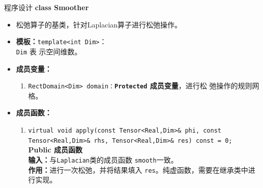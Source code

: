 \documentclass{beamer}
\begin{document}
\begin{frame}{程序设计}
\textbf{\large class Smoother}
\begin{itemize}
    \item 松弛算子的基类，针对Laplacian算子进行松弛操作。
    \item \textbf{模板：}\texttt{template<int Dim>}：\\\texttt{Dim} 表
      示空间维数。
       \item \textbf{成员变量：}
        \begin{enumerate}[(1)]
        \item \texttt{RectDomain<Dim>
                domain：}\textbf{\texttt{Protected}  成员变量}，进行松
              弛操作的规则网格。
        \end{enumerate}
    \item \textbf{成员函数：}
            \begin{enumerate}[(1)]
            \item \texttt{virtual void apply(const Tensor<Real,Dim>\& phi, const Tensor<Real,Dim>\&
                     rhs, Tensor<Real,Dim>\& res) const = 0;}\\
              \textbf{Public 成员函数}\\
            \textbf{输入：}与\texttt{Laplacian}类的成员函数
            \texttt{smooth}一致。\\
            \textbf{作用：}进行一次松弛，并将结果填入
            \texttt{res}。纯虚函数，需要在继承类中进行实现。
            \end{enumerate}
          \end{itemize}


\end{frame}
\end{document}
